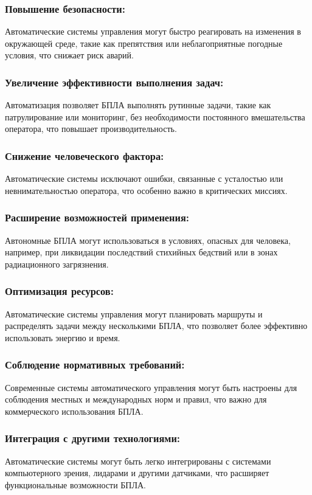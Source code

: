 \documentclass[a4paper]{bsuir-tor}
\begin{document}
\subsubsection{Повышение безопасности: }
Автоматические системы управления могут быстро реагировать на
изменения в окружающей среде, такие как препятствия или
неблагоприятные погодные условия, что снижает риск аварий.

  \subsubsection{Увеличение эффективности выполнения задач: }
  Автоматизация позволяет БПЛА выполнять рутинные задачи, такие как
  патрулирование или мониторинг, без необходимости постоянного
  вмешательства оператора, что повышает производительность.

  \subsubsection{Снижение человеческого фактора: }
  Автоматические системы исключают ошибки, связанные с усталостью или
  невнимательностью оператора, что особенно важно в критических миссиях.

  \subsubsection{Расширение возможностей применения: }
  Автономные БПЛА могут использоваться в условиях, опасных для
  человека, например, при ликвидации последствий стихийных бедствий или
  в зонах радиационного загрязнения.

  \subsubsection{Оптимизация ресурсов: }
  Автоматические системы управления могут планировать маршруты и
  распределять задачи между несколькими БПЛА, что позволяет более
  эффективно использовать энергию и время.

  \subsubsection{Соблюдение нормативных требований: }
  Современные системы автоматического управления могут быть настроены
  для соблюдения местных и международных норм и правил, что важно для
  коммерческого использования БПЛА.

  \subsubsection{Интеграция с другими технологиями: }
  Автоматические системы могут быть легко интегрированы с системами
  компьютерного зрения, лидарами и другими датчиками, что расширяет
  функциональные возможности БПЛА.
\end{document}
